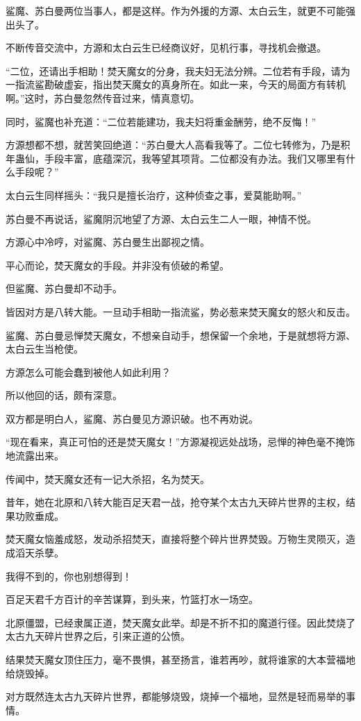 \begin{this_body}
鲨魔、苏白曼两位当事人，都是这样。作为外援的方源、太白云生，就更不可能强出头了。

不断传音交流中，方源和太白云生已经商议好，见机行事，寻找机会撤退。

“二位，还请出手相助！焚天魔女的分身，我夫妇无法分辨。二位若有手段，请为一指流鲨勘破虚妄，指出焚天魔女的真身所在。如此一来，今天的局面方有转机啊。”这时，苏白曼忽然传音过来，情真意切。

同时，鲨魔也补充道：“二位若能建功，我夫妇将重金酬劳，绝不反悔！”

方源想都不想，就苦笑回绝道：“苏白曼大人高看我等了。二位七转修为，乃是积年蛊仙，手段丰富，底蕴深沉，我等望其项背。二位都没有办法。我们又哪里有什么手段呢？”

太白云生同样摇头：“我只是擅长治疗，这种侦查之事，爱莫能助啊。”

苏白曼不再说话，鲨魔阴沉地望了方源、太白云生二人一眼，神情不悦。

方源心中冷哼，对鲨魔、苏白曼生出鄙视之情。

平心而论，焚天魔女的手段。并非没有侦破的希望。

但鲨魔、苏白曼却不动手。

皆因对方是八转大能。一旦动手相助一指流鲨，势必惹来焚天魔女的怒火和反击。

鲨魔、苏白曼忌惮焚天魔女，不想亲自动手，想保留一个余地，于是就想将方源、太白云生当枪使。

方源怎么可能会蠢到被他人如此利用？

所以他回的话，颇有深意。

双方都是明白人，鲨魔、苏白曼见方源识破。也不再劝说。

“现在看来，真正可怕的还是焚天魔女！”方源凝视远处战场，忌惮的神色毫不掩饰地流露出来。

传闻中，焚天魔女还有一记大杀招，名为焚天。

昔年，她在北原和八转大能百足天君一战，抢夺某个太古九天碎片世界的主权，结果功败垂成。

焚天魔女恼羞成怒，发动杀招焚天，直接将整个碎片世界焚毁。万物生灵陨灭，造成滔天杀孽。

我得不到的，你也别想得到！

百足天君千方百计的辛苦谋算，到头来，竹篮打水一场空。

北原僵盟，已经隶属正道，焚天魔女此举。却是不折不扣的魔道行径。因此焚烧了太古九天碎片世界之后，引来正道的公愤。

结果焚天魔女顶住压力，毫不畏惧，甚至扬言，谁若再吵，就将谁家的大本营福地给烧毁掉。

对方既然连太古九天碎片世界，都能够烧毁，烧掉一个福地，显然是轻而易举的事情。


\end{this_body}
